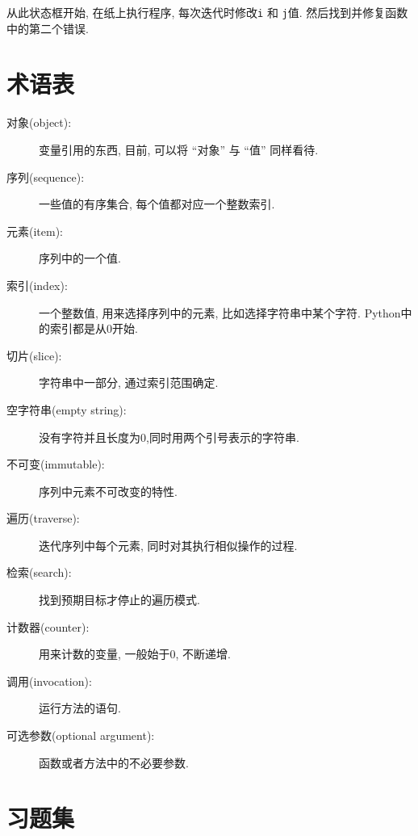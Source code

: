 \documentclass[10pt]{book}
\begin{document}
从此状态框开始, 在纸上执行程序, 每次迭代时修改{\tt i} 和 {\tt j}值. 
然后找到并修复函数中的第二个错误. 
\label{isreverse}


\section{术语表}

\begin{description}

\item[对象(object):] 变量引用的东西, 目前, 可以将
``对象'' 与 ``值'' 同样看待. 

\item[序列(sequence):] 一些值的有序集合, 每个值都对应一个整数索引. 

\item[元素(item):] 序列中的一个值.

\item[索引(index):] 一个整数值, 用来选择序列中的元素, 
比如选择字符串中某个字符. Python中的索引都是从0开始. 

\item[切片(slice):] 字符串中一部分, 通过索引范围确定. 

\item[空字符串(empty string):] 没有字符并且长度为0,同时用两个引号表示的字符串. 

\item[不可变(immutable):] 序列中元素不可改变的特性. 

\item[遍历(traverse):] 迭代序列中每个元素, 同时对其执行相似操作的过程. 

\item[检索(search):] 找到预期目标才停止的遍历模式. 

\item[计数器(counter):] 用来计数的变量, 一般始于0, 不断递增. 

\item[调用(invocation):] 运行方法的语句.

\item[可选参数(optional argument):] 函数或者方法中的不必要参数. 

\end{description}


\section{习题集}
\end{document}
